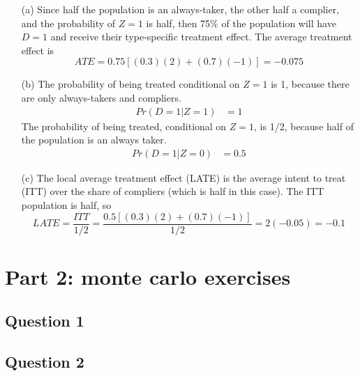 \documentclass[12pt]{article}
\begin{document}
\begin{enumerate}
    \item[(a)] Since half the population is an always-taker, the other half a complier, and the probability of $Z=1$ is half, then 75\% of the population will have $D=1$ and receive their type-specific treatment effect. The average treatment effect is 
          \[ ATE = 0.75[(0.3)(2) + (0.7)(-1)] = -0.075 \]
    \item[(b)] The probability of being treated conditional on $Z=1$ is 1, because there are only always-takers and compliers.  
            \begin{align*}
                Pr(D=1 | Z=1) & = 1 
            \end{align*} 
        The probability of being treated, conditional on $Z=1$, is 1/2, because half of the population is an always taker. 
            \begin{align*}
              Pr(D=1 | Z=0) & = 0.5 
            \end{align*}
    \item[(c)] The local average treatment effect (LATE) is the average intent to treat (ITT) over the share of compliers (which is half in this case). The ITT population is half, so 
        \[LATE = \frac{ITT}{1/2} = \frac{0.5[(0.3)(2) + (0.7)(-1)]}{1/2}
               = 2(-0.05) = -0.1\]
\end{enumerate}


\section*{Part 2: monte carlo exercises}
\subsection*{Question 1}
\subsection*{Question 2}
\end{document}
